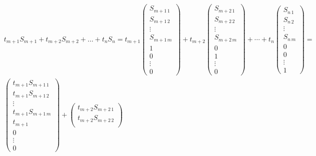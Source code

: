\documentclass{article}
\theoremstyle{plain}
\theoremstyle{definition}
\theoremstyle{remark}
\begin{document}
\begin{equation}\label{eq:sistsol}
    \begin{aligned}
    &t_{m+1}S_{m+1} + t_{m+2}S_{m+2} + \ldots + t_nS_n =
    t_{m+1}
    \begin{pmatrix}
        S_{m+1\,1}\\
        S_{m+1\,2}\\
        \vdots\\
        S_{m+1\,m}\\
        1\\
        0\\
        \vdots\\
        0
    \end{pmatrix}
    +
    t_{m+2}
    \begin{pmatrix}
        S_{m+2\,1}\\
        S_{m+2\,2}\\
        \vdots\\
        S_{m+2\,m}\\
        0\\
        1\\
        \vdots\\
        0
    \end{pmatrix}
    +
    \cdots
    +
    t_n
    \begin{pmatrix}
        S_{n\,1}\\
        S_{n\,2}\\
        \vdots\\
        S_{n\,m}\\
        0\\
        0\\
        \vdots\\
        1
    \end{pmatrix}=\\
    & 
    \begin{pmatrix}
        t_{m+1}S_{m+1\,1}\\
        t_{m+1}S_{m+1\,2}\\
        \vdots\\
        t_{m+1}S_{m+1\,m}\\
        t_{m+1}\\
        0\\
        \vdots\\
        0
    \end{pmatrix}
    +
    \begin{pmatrix}
        t_{m+2}S_{m+2\,1}\\
        t_{m+2}S_{m+2\,2}\\

\end{pmatrix}
\end{aligned}
\end{equation}
\end{document}
